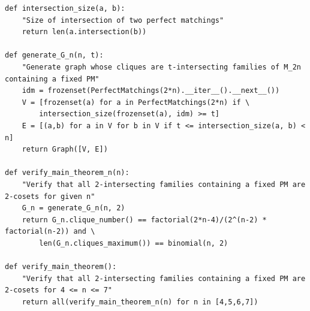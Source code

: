 \documentclass[10pt,a4paper]{amsart}
\theoremstyle{definition}
\begin{document}
\begin{lstlisting}
def intersection_size(a, b):
    "Size of intersection of two perfect matchings"
    return len(a.intersection(b))

def generate_G_n(n, t):
    "Generate graph whose cliques are t-intersecting families of M_2n containing a fixed PM"
    idm = frozenset(PerfectMatchings(2*n).__iter__().__next__())
    V = [frozenset(a) for a in PerfectMatchings(2*n) if \
        intersection_size(frozenset(a), idm) >= t]
    E = [(a,b) for a in V for b in V if t <= intersection_size(a, b) < n]
    return Graph([V, E])

def verify_main_theorem_n(n):
    "Verify that all 2-intersecting families containing a fixed PM are 2-cosets for given n"
    G_n = generate_G_n(n, 2)
    return G_n.clique_number() == factorial(2*n-4)/(2^(n-2) * factorial(n-2)) and \
        len(G_n.cliques_maximum()) == binomial(n, 2)

def verify_main_theorem():
    "Verify that all 2-intersecting families containing a fixed PM are 2-cosets for 4 <= n <= 7"
    return all(verify_main_theorem_n(n) for n in [4,5,6,7])
\end{lstlisting}
\end{document}
